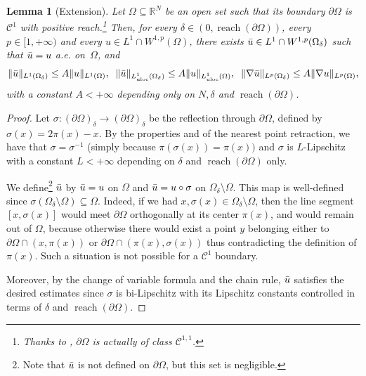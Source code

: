 \documentclass[JEP,XML,SOM,Unicode,published]{cedram}
\theoremstyle{plain}
\newtheorem{lemma}[theorem]{Lemma}
\theoremstyle{definition}
\newcommand{\R}{\mathbb{R}}
\newcommand{\Cspace}{\mathscr{C}}
\newcommand{\uloc}{L^1_\mathrm{uloc}}
\DeclarePairedDelimiter{\norm}{\lVert}{\rVert}
\DeclareMathOperator{\reach}{reach}
\begin{document}
\begin{lemma}[Extension]\label{lemmaExtension}
Let \(\Omega\subseteq\R^N\) be an open set such that its boundary \(\partial\Omega\) is~\(\Cspace^1\) with positive reach.\footnote{Thanks to \cite[Rem.\,4.20]{federerCurvatureMeasures1959}, $\partial \Omega$ is actually of class $\Cspace^{1,1}$.} Then, for every \(\delta\in (0,\reach(\partial\Omega))\), every \(p\in [1,+\infty)\) and every \(u\in L^1\cap W^{1,p}(\Omega)\), there exists \(\Bar{u}\in L^1\cap W^{1,p}(\Omega_\delta)\) such that \(\Bar{u}=u\) a.e. on~\(\Omega\), and
\[
\norm{\Bar{u}}_{L^1(\Omega_\delta)}\leq A \norm{u}_{L^1(\Omega)},
\;\;
\norm{\Bar{u}}_{\uloc({\Omega}_\delta)}\leq A \norm{u}_{\uloc(\Omega)},
\;\;
\norm{\nabla\Bar{u}}_{L^p(\Omega_\delta)}\leq A\norm{\nabla u}_{L^p(\Omega)},
\]
with a constant \(A<+\infty\) depending only on \(N,\delta\) and \(\reach(\partial\Omega)\).
\end{lemma}
\begin{proof}
Let \(\sigma:(\partial\Omega)_\delta\to (\partial\Omega)_\delta\) be the reflection through \(\partial\Omega\), defined by \(\sigma(x)=2\pi(x)-x\). By the properties  and  of the nearest point retraction, we have that \(\sigma=\sigma^{-1}\) (simply because $\pi(\sigma(x)) = \pi(x))$ and $\sigma$ is \(L\)-Lipschitz with a constant \(L<+\infty\) depending on \(\delta\) and \(\reach(\partial\Omega)\) only.

We define\footnote{Note that \(\Bar{u}\) is not defined on \(\partial\Omega\), but this set is negligible.} \(\Bar{u}\) by \(\Bar{u}=u\) on \(\Omega\) and \(\Bar{u}=u\circ\sigma\) on \(\Omega_\delta\setminus{\Omega}\). This map is well-defined since \(\sigma(\Omega_\delta\setminus{\Omega})\subseteq\Omega\). Indeed, if we had \(x,\sigma(x)\in\Omega_\delta\setminus{\Omega}\), then the line segment \([x,\sigma(x)]\) would meet \(\partial\Omega\) orthogonally at its center \(\pi(x)\), and would remain out of \({\Omega}\), because otherwise there would exist a point $y$ belonging either to $\partial \Omega \cap (x,\pi(x))$ or $\partial \Omega \cap (\pi(x),\sigma(x))$ thus contradicting the definition of $\pi(x)$. Such a situation is not possible for a \(\Cspace^1\) boundary.

Moreover, by the change of variable formula and the chain rule, \(\Bar{u}\) satisfies the desired estimates since \(\sigma\) is bi-Lipschitz with its Lipschitz constants controlled in terms of \(\delta\) and \(\reach(\partial\Omega)\).
\end{proof}
\end{document}
